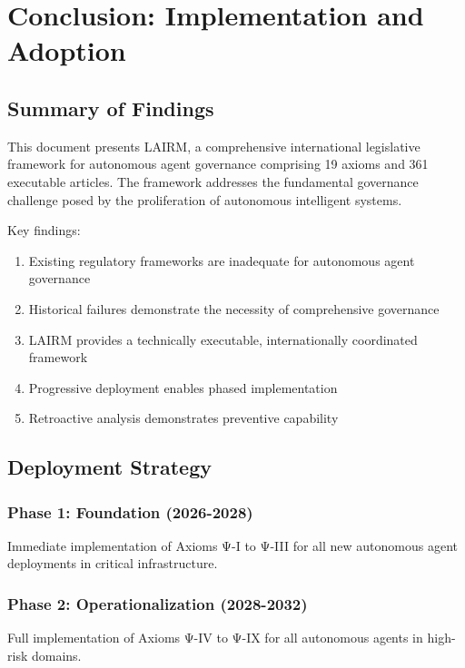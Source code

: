 \documentclass[12pt,a4paper,twoside,openright]{book}
\begin{document}
\chapter{Conclusion: Implementation and Adoption}
\label{ch:conclusion}

\section{Summary of Findings}

This document presents LAIRM, a comprehensive international legislative framework for autonomous agent governance comprising 19 axioms and 361 executable articles. The framework addresses the fundamental governance challenge posed by the proliferation of autonomous intelligent systems.

Key findings:

\begin{enumerate}
    \item Existing regulatory frameworks are inadequate for autonomous agent governance
    \item Historical failures demonstrate the necessity of comprehensive governance
    \item LAIRM provides a technically executable, internationally coordinated framework
    \item Progressive deployment enables phased implementation
    \item Retroactive analysis demonstrates preventive capability
\end{enumerate}

\section{Deployment Strategy}

\subsection{Phase 1: Foundation (2026-2028)}

Immediate implementation of Axioms Ψ-I to Ψ-III for all new autonomous agent deployments in critical infrastructure.

\subsection{Phase 2: Operationalization (2028-2032)}

Full implementation of Axioms Ψ-IV to Ψ-IX for all autonomous agents in high-risk domains.
\end{document}
